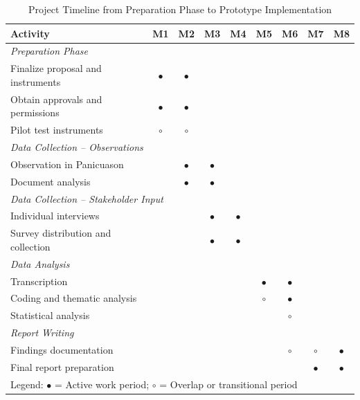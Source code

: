 \documentclass[12pt]{report}
\begin{document}
\begin{table}[htbp]
  \centering
  \caption{Project Timeline from Preparation Phase to Prototype Implementation}
  \label{tab:timeline}
  \small
  \begin{tabular}{lcccccccc}
    \toprule
    \textbf{Activity} & \textbf{M1} & \textbf{M2} & \textbf{M3} &
    \textbf{M4} & \textbf{M5} & \textbf{M6} & \textbf{M7} & \textbf{M8} \\
    \midrule
    \multicolumn{9}{l}{\textit{Preparation Phase}} \\
    Finalize proposal and instruments
      & $\bullet$ & $\bullet$ & & & & & & \\
    Obtain approvals and permissions
      & $\bullet$ & $\bullet$ & & & & & & \\
    Pilot test instruments
      & $\circ$   & $\circ$   & & & & & & \\
    \midrule
    \multicolumn{9}{l}{\textit{Data Collection -- Observations}} \\
    Observation in Panicuason
      & & $\bullet$ & $\bullet$ & & & & & \\
    Document analysis
      & & $\bullet$ & $\bullet$ & & & & & \\
    \midrule
    \multicolumn{9}{l}{\textit{Data Collection -- Stakeholder Input}} \\
    Individual interviews
      & & & $\bullet$ & $\bullet$ & & & & \\
    Survey distribution and collection
      & & & $\bullet$ & $\bullet$ & & & & \\
    \midrule
    \multicolumn{9}{l}{\textit{Data Analysis}} \\
    Transcription
      & & & & & $\bullet$ & $\bullet$ & & \\
    Coding and thematic analysis
      & & & & & $\circ$   & $\bullet$ & & \\
    Statistical analysis
      & & & & & & $\circ$   & & \\
    \midrule
    \multicolumn{9}{l}{\textit{Report Writing}} \\
    Findings documentation
      & & & & & & $\circ$ & $\circ$ & $\bullet$ \\
    Final report preparation
      & & & & & & & $\bullet$ & $\bullet$ \\
    \bottomrule
    \multicolumn{9}{l}{Legend: $\bullet$ = Active work period;\quad
                                $\circ$ = Overlap or transitional period} \\
  \end{tabular}
\end{table}
\end{document}
